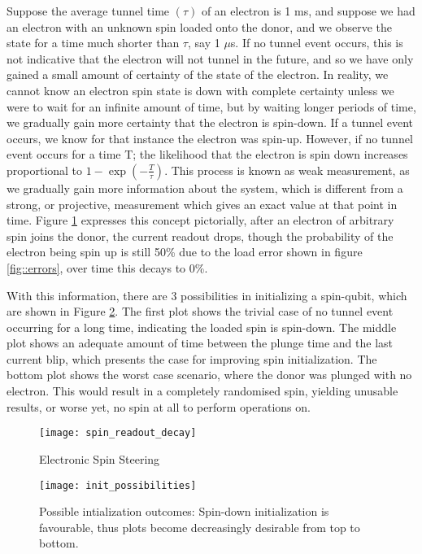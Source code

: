		Suppose the average tunnel time $(\tau)$ of an electron is 1 ms, and suppose we had an electron with an unknown spin loaded onto the donor, and we observe the state for a time much shorter than $\tau$, say 1 $\mu$s. If no tunnel event occurs, this is not indicative that the electron will not tunnel in the future, and so we have only gained a small amount of certainty of the state of the electron. In reality, we cannot know an electron spin state is down with complete certainty unless we were to wait for an infinite amount of time, but by waiting longer periods of time, we gradually gain more certainty that the electron is spin-down. If a tunnel event occurs, we know for that instance the electron was spin-up. However, if no tunnel event occurs for a time T; the likelihood that the electron is spin down increases proportional to $1-\exp\left(-\frac{T}{\tau}\right)$. This process is known as weak measurement, as we gradually gain more information about the system, which is different from a strong, or projective, measurement which gives an exact value at that point in time. Figure \ref{fig::spin_readout_decay} expresses this concept pictorially, after an electron of arbitrary spin joins the donor, the current readout drops, though the probability of the electron being spin up is still 50\% due to the load error shown in figure \ref{fig::errors}, over time this decays to 0\%. 
		
		With this information, there are 3 possibilities in initializing a spin-qubit, which are shown in Figure \ref{fig::init_possibilities}. The first plot shows the trivial case of no tunnel event occurring for a long time, indicating the loaded spin is spin-down. The middle plot shows an adequate amount of time between the plunge time and the last current blip, which presents the case for improving spin initialization. The bottom plot shows the worst case scenario, where the donor was plunged with no electron. This would result in a completely randomised spin, yielding unusable results, or worse yet, no spin at all to perform operations on. 
		
		\begin{figure}[htbp!]
			\centering
			\texttt{[image: spin\_readout\_decay]}
			\caption{Electronic Spin Steering}
			\label{fig::spin_readout_decay}
		\end{figure}
		
		\begin{figure}[htbp!]
			\centering
			\texttt{[image: init\_possibilities]}
			\caption[Possible initialisation outcomes]{Possible intialization outcomes: Spin-down initialization is favourable, thus plots become decreasingly desirable from top to bottom.}
			\label{fig::init_possibilities}
		\end{figure}
		
